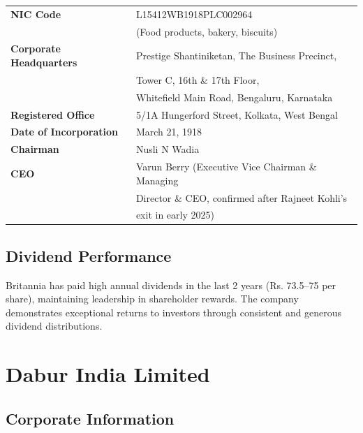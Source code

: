 \documentclass[12pt, a4paper]{report}
\begin{document}
\begin{tabular}{ll}
    \textbf{NIC Code} & L15412WB1918PLC002964 \\
                      & (Food products, bakery, biscuits) \\
    \textbf{Corporate Headquarters} & Prestige Shantiniketan, The Business Precinct, \\
                                    & Tower C, 16th \& 17th Floor, \\
                                    & Whitefield Main Road, Bengaluru, Karnataka \\
    \textbf{Registered Office} & 5/1A Hungerford Street, Kolkata, West Bengal \\
    \textbf{Date of Incorporation} & March 21, 1918 \\
    \textbf{Chairman} & Nusli N Wadia \\
    \textbf{CEO} & Varun Berry (Executive Vice Chairman \& Managing \\
               & Director \& CEO, confirmed after Rajneet Kohli's \\
               & exit in early 2025) \\
\end{tabular}

\subsection{Dividend Performance}

Britannia has paid high annual dividends in the last 2 years (Rs. 73.5–75 per share), maintaining leadership in shareholder rewards. The company demonstrates exceptional returns to investors through consistent and generous dividend distributions.

\section{Dabur India Limited}

\subsection{Corporate Information}
\end{document}

